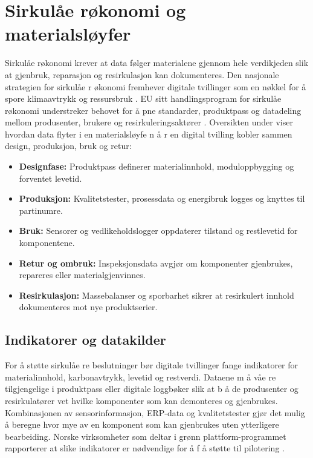 \section{Sirkulåe røkonomi og materialsløyfer}
Sirkulåe røkonomi krever at data følger materialene gjennom hele verdikjeden slik at gjenbruk, reparasjon og resirkulasjon kan dokumenteres. Den nasjonale strategien for sirkulåe r økonomi fremhever digitale tvillinger som en nøkkel for  å spore klimaavtrykk og ressursbruk \citep{regjeringen2021sirkulaer}. EU sitt handlingsprogram for sirkulåe røkonomi understreker behovet for  å pne standarder, produktpass og datadeling mellom produsenter, brukere og resirkuleringsaktører \citep{eu2020circulareconomy}. Oversikten under viser hvordan data flyter i en materialsløyfe n å r en digital tvilling kobler sammen design, produksjon, bruk og retur:
\begin{itemize}
    \item \textbf{Designfase:} Produktpass definerer materialinnhold, moduloppbygging og forventet levetid.
    \item \textbf{Produksjon:} Kvalitetstester, prosessdata og energibruk logges og knyttes til partinumre.
    \item \textbf{Bruk:} Sensorer og vedlikeholdslogger oppdaterer tilstand og restlevetid for komponentene.
    \item \textbf{Retur og ombruk:} Inspeksjonsdata avgjør om komponenter gjenbrukes, repareres eller materialgjenvinnes.
    \item \textbf{Resirkulasjon:} Massebalanser og sporbarhet sikrer at resirkulert innhold dokumenteres mot nye produktserier.
\end{itemize}

\subsection{Indikatorer og datakilder}
For  å støtte sirkulåe re beslutninger bør digitale tvillinger fange indikatorer for materialinnhold, karbonavtrykk, levetid og restverdi. Dataene m å våe re tilgjengelige i produktpass eller digitale loggbøker slik at b å de produsenter og resirkulatører vet hvilke komponenter som kan demonteres og gjenbrukes. Kombinasjonen av sensorinformasjon, ERP-data og kvalitetstester gjør det mulig  å beregne hvor mye av en komponent som kan gjenbrukes uten ytterligere bearbeiding. Norske virksomheter som deltar i grønn plattform-programmet rapporterer at slike indikatorer er nødvendige for  å f å støtte til pilotering \citep{miljodir2022sirkular}.

